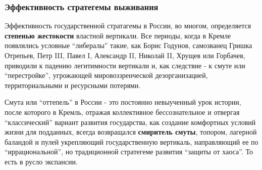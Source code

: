  
 
 
 
 

\subsubsection{Эффективность стратегемы выживания}
\label{sec:16_01_2022.stz.news.ua.hvylya.1.anatomia_vraga.6.effektivnost_stratagemy}

Эффективность государственной стратагемы в России, во многом, определяется
\textbf{степенью жестокости} властной вертикали. Все периоды, когда в Кремле появлялись
условные \enquote{либералы} такие, как Борис Годунов, самозванец Гришка Отрепьев, Петр
III, Павел I, Александр II, Николай II, Хрущев или Горбачев, приводили к
падению легитимности вертикали и, как следствие - к смуте или \enquote{перестройке},
угрожающей мировоззренческой дезорганизацией, территориальными и ресурсными
потерями.

Смута или \enquote{оттепель} в России - это постоянно невыученный урок истории, после
которого в Кремль, отражая коллективное бессознательное и отвергая
\enquote{классический} вариант развития государства, как создание комфортных условий
жизни для подданных, всегда возвращался \textbf{смиритель смуты}, топором, лагерной
баландой и пулей укрепляющий государственную вертикаль, направляющий ее по
\enquote{иррациональной}, но традиционной стратегеме развития \enquote{защиты от хаоса}. То
есть в русло экспансии.
